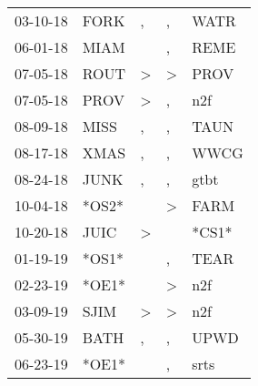 \begin{supertabular}{p{0.07\textwidth}p{0.06\textwidth}p{0.02\textwidth}p{0.02\textwidth}p{0.06\textwidth}}
          03-10-18\textsuperscript{} &           FORK\textsuperscript{} &                , &                , &           WATR\textsuperscript{} \\
          06-01-18\textsuperscript{} &           MIAM\textsuperscript{} &                  &                , &           REME\textsuperscript{} \\
          07-05-18\textsuperscript{} &           ROUT\textsuperscript{} &     \textgreater &     \textgreater &           PROV\textsuperscript{} \\
          07-05-18\textsuperscript{} &           PROV\textsuperscript{} &     \textgreater &                , &            n2f\textsuperscript{} \\
          08-09-18\textsuperscript{} &           MISS\textsuperscript{} &                , &                , &           TAUN\textsuperscript{} \\
          08-17-18\textsuperscript{} &           XMAS\textsuperscript{} &                , &                , &           WWCG\textsuperscript{} \\
          08-24-18\textsuperscript{} &           JUNK\textsuperscript{} &                , &                , &           gtbt\textsuperscript{} \\
          10-04-18\textsuperscript{} &                            *OS2* &                  &     \textgreater &           FARM\textsuperscript{} \\
          10-20-18\textsuperscript{} &           JUIC\textsuperscript{} &     \textgreater &                  &                            *CS1* \\
          01-19-19\textsuperscript{} &                            *OS1* &                  &                , &           TEAR\textsuperscript{} \\
          02-23-19\textsuperscript{} &                            *OE1* &                  &     \textgreater &            n2f\textsuperscript{} \\
          03-09-19\textsuperscript{} &           SJIM\textsuperscript{} &     \textgreater &     \textgreater &            n2f\textsuperscript{} \\
          05-30-19\textsuperscript{} &           BATH\textsuperscript{} &                , &                , &           UPWD\textsuperscript{} \\
          06-23-19\textsuperscript{} &                            *OE1* &                  &                , &           srts\textsuperscript{} \\

\end{supertabular}
